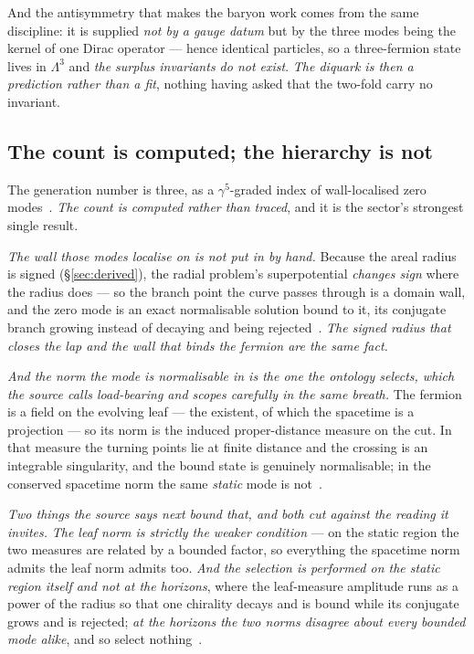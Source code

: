 \documentclass[11pt,a4paper]{article}
\theoremstyle{plain}
\theoremstyle{definition}
\begin{document}
And the antisymmetry that makes the baryon work comes from the same discipline: it is supplied \emph{not by a
gauge datum} but by the three modes being the kernel of one Dirac operator --- hence identical particles, so
a three-fermion state lives in $\Lambda^{3}$ and \emph{the surplus invariants do not exist}. \emph{The
diquark is then a prediction rather than a fit}, nothing having asked that the two-fold carry no invariant.

\subsection{The count is computed; the hierarchy is not}

The generation number is three, as a $\gamma^{5}$-graded index of wall-localised zero
modes~\cite{JanzenMatter}. \emph{The count is computed rather than traced}, and it is the sector's
strongest single result.

\emph{The wall those modes localise on is not put in by hand.} Because the areal radius is signed
(\S\ref{sec:derived}), the radial problem's superpotential \emph{changes sign} where the radius does --- so
the branch point the curve passes through is a domain wall, and the zero mode is an exact normalisable
solution bound to it, its conjugate branch growing instead of decaying and being
rejected~\cite{JanzenMatter}. \emph{The signed radius that closes the lap and the wall that binds the
fermion are the same fact.}

\emph{And the norm the mode is normalisable in is the one the ontology selects, which the source calls
load-bearing and scopes carefully in the same breath.} The fermion is a field on the evolving leaf --- the
existent, of which the spacetime is a projection --- so its norm is the induced proper-distance measure on
the cut. In that measure the turning points lie at finite distance and the crossing is an integrable
singularity, and the bound state is genuinely normalisable; in the conserved spacetime norm the same
\emph{static} mode is not~\cite{JanzenMatter}.

\emph{Two things the source says next bound that, and both cut against the reading it invites.} \emph{The
leaf norm is strictly the weaker condition} --- on the static region the two measures are related by a
bounded factor, so everything the spacetime norm admits the leaf norm admits too. \emph{And the selection is
performed on the static region itself and not at the horizons}, where the leaf-measure amplitude runs as a
power of the radius so that one chirality decays and is bound while its conjugate grows and is rejected;
\emph{at the horizons the two norms disagree about every bounded mode alike}, and so select
nothing~\cite{JanzenMatter}.
\end{document}
